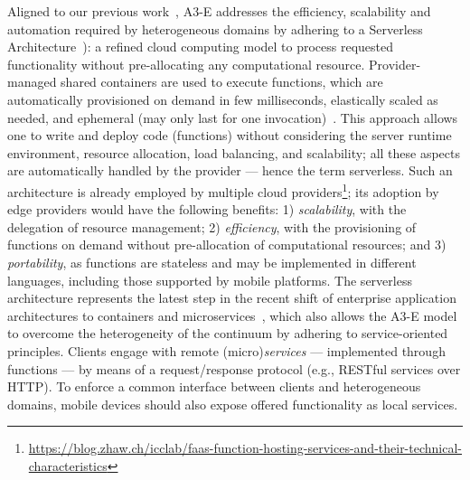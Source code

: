 

Aligned to our previous work~\cite{GarrigaMendonca2017}, A3-E addresses the efficiency, scalability and automation required by heterogeneous domains by adhering to a Serverless Architecture~\cite{Hendrickson:2016}): a refined cloud computing model to process requested functionality without pre-allocating any computational resource. Provider-managed shared containers are used to execute functions, which are automatically provisioned on demand in few milliseconds, elastically scaled as needed, and ephemeral (may only last for one invocation)~\cite{Roberts:2016}. This approach allows one to write and deploy code (functions) without considering the server runtime environment, resource allocation, load balancing, and scalability; all these aspects are automatically handled by the provider --- hence the term serverless.
Such an architecture is already employed by multiple cloud providers\footnote{\url{https://blog.zhaw.ch/icclab/faas-function-hosting-services-and-their-technical-characteristics}}; its adoption by edge providers would have the following benefits: 1) \textit{scalability}, with the delegation of resource management; 2) \textit{efficiency}, with the provisioning of functions on demand without pre-allocation of computational resources; and 3) \textit{portability}, as functions are stateless and may be implemented in different languages, including those supported by mobile platforms. 
The serverless architecture represents the latest step in the recent shift of enterprise application architectures to containers and microservices~\cite{baldini2017serverless}, which also allows the A3-E model to overcome the heterogeneity of the continuum by adhering to service-oriented principles. Clients engage with remote (micro)\textit{services} --- implemented through functions --- by means of a request/response protocol (e.g., RESTful services over HTTP). To enforce a common interface between clients and heterogeneous domains, mobile devices should also expose offered functionality as local services. 

